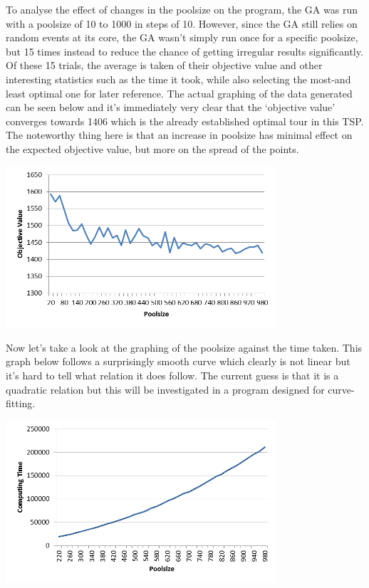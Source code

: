 \par
To analyse the effect of changes in the poolsize on the program, the GA was run with a poolsize of 10 to 1000 in steps of 10. However, since the GA still relies on random events at its core, the GA wasn’t simply run once for a specific poolsize, but 15 times instead to reduce the chance of getting irregular results significantly. Of these 15 trials, the average is taken of their objective value and other interesting statistics such as the time it took, while also selecting the most-and least optimal one for later reference.
The actual graphing of the data generated can be seen below and it’s immediately very clear that the ‘objective value’ converges towards 1406 which is the already established optimal tour in this TSP. The noteworthy thing here is that an increase in poolsize has minimal effect on the expected objective value, but more on the spread of the points.

	\includegraphics[height=6cm]{OVP}

\par
Now let’s take a look at the graphing of the poolsize against the time taken. 
This graph below follows a surprisingly smooth curve which clearly is not linear but it’s hard to tell what relation it does follow. The current guess is that it is a quadratic relation but this will be investigated in a program designed for curve-fitting.

	\includegraphics[height=6cm]{CTP}


